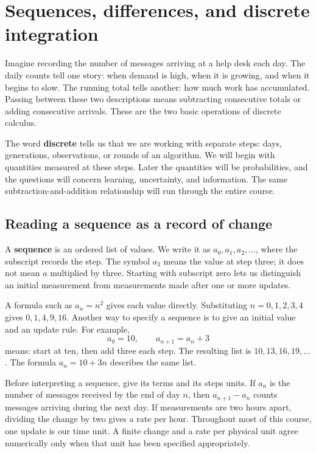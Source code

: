\documentclass[11pt,oneside,openany]{book}
\theoremstyle{definition}
\theoremstyle{remark}
\numberwithin{equation}{chapter}
\begin{document}
\tableofcontents
\mainmatter

\chapter{Sequences, differences, and discrete integration}
Imagine recording the number of messages arriving at a help desk each day. The daily counts tell one story: when demand is high, when it is growing, and when it begins to slow. The running total tells another: how much work has accumulated. Passing between these two descriptions means subtracting consecutive totals or adding consecutive arrivals. These are the two basic operations of discrete calculus.

The word \textbf{discrete} tells us that we are working with separate steps: days, generations, observations, or rounds of an algorithm. We will begin with quantities measured at these steps. Later the quantities will be probabilities, and the questions will concern learning, uncertainty, and information. The same subtraction-and-addition relationship will run through the entire course.

\section{Reading a sequence as a record of change}\label{ch01-reading-a-sequence-as-a-record-of-change}

A \textbf{sequence} is an ordered list of values. We write it as \(a_0,a_1,a_2,\ldots\), where the subscript records the step. The symbol \(a_3\) means the value at step three; it does not mean \(a\) multiplied by three. Starting with subscript zero lets us distinguish an initial measurement from measurements made after one or more updates.

A formula such as \(a_n=n^2\) gives each value directly. Substituting \(n=0,1,2,3,4\) gives \(0,1,4,9,16\). Another way to specify a sequence is to give an initial value and an update rule. For example, \[a_0=10,\qquad a_{n+1}=a_n+3\] means: start at ten, then add three each step. The resulting list is \(10,13,16,19,\ldots\). The formula \(a_n=10+3n\) describes the same list.

Before interpreting a sequence, give its terms and its steps units. If \(a_n\) is the number of messages received by the end of day \(n\), then \(a_{n+1}-a_n\) counts messages arriving during the next day. If measurements are two hours apart, dividing the change by two gives a rate per hour. Throughout most of this course, one update is our time unit. A finite change and a rate per physical unit agree numerically only when that unit has been specified appropriately.
\end{document}
